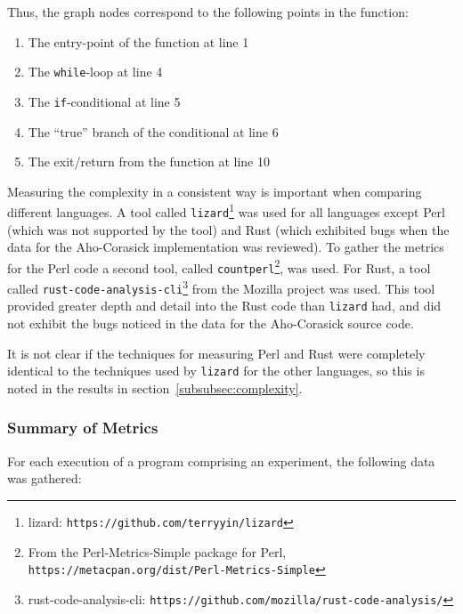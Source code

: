 Thus, the graph nodes correspond to the following points in the function:

\begin{enumerate}
\item The entry-point of the function at line 1
\item The \texttt{while}-loop at line 4
\item The \texttt{if}-conditional at line 5
\item The ``true'' branch of the conditional at line 6
\item The exit/return from the function at line 10
\end{enumerate}

Measuring the complexity in a consistent way is important when comparing different languages. A tool called \texttt{lizard}\footnote{lizard: \texttt{https://github.com/terryyin/lizard}} was used for all languages except Perl (which was not supported by the tool) and Rust (which exhibited bugs when the data for the Aho-Corasick implementation was reviewed). To gather the metrics for the Perl code a second tool, called \texttt{countperl}\footnote{From the Perl-Metrics-Simple package for Perl, \texttt{https://metacpan.org/dist/Perl-Metrics-Simple}}, was used. For Rust, a tool called \texttt{rust-code-analysis-cli}\footnote{rust-code-analysis-cli: \texttt{https://github.com/mozilla/rust-code-analysis/}} from the Mozilla project was used. This tool provided greater depth and detail into the Rust code than \texttt{lizard} had, and did not exhibit the bugs noticed in the data for the Aho-Corasick source code.

It is not clear if the techniques for measuring Perl and Rust were completely identical to the techniques used by \texttt{lizard} for the other languages, so this is noted in the results in section~\ref{subsubsec:complexity}.

\subsubsection{Summary of Metrics}

For each execution of a program comprising an experiment, the following data was gathered:

